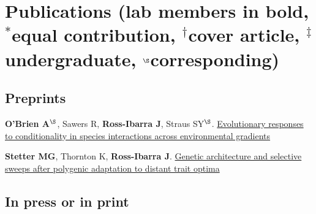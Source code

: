 \documentclass[letterpaper,10pt]{article}
\renewenvironment{itemize}{
  \begin{list}{}{
    \setlength{\leftmargin}{1.5em}
  }
}{
  \end{list}
}
\begin{document}

\section*{Publications {\small(lab members in bold, $^*$equal contribution, $^\dagger$cover article, $^\ddagger$undergraduate, $^\S$corresponding)}}

\subsection*{Preprints}
\begin{itemize}

\item {\bf O'Brien A}$^\S$, Sawers R, {\bf Ross-Ibarra J}, Straus SY$^\S$. \href{http://biorxiv.org/content/early/2015/11/11/031195?utm_source=dlvr.it&utm_medium=twitter}{Evolutionary responses to conditionality in species interactions across environmental gradients}



\item {\bf Stetter MG}, Thornton K, {\bf Ross-Ibarra J}.
\href{https://biorxiv.org}{Genetic architecture and selective sweeps after polygenic adaptation to distant trait optima}

\end{itemize}

\subsection*{In press or in print} %
\end{document}
